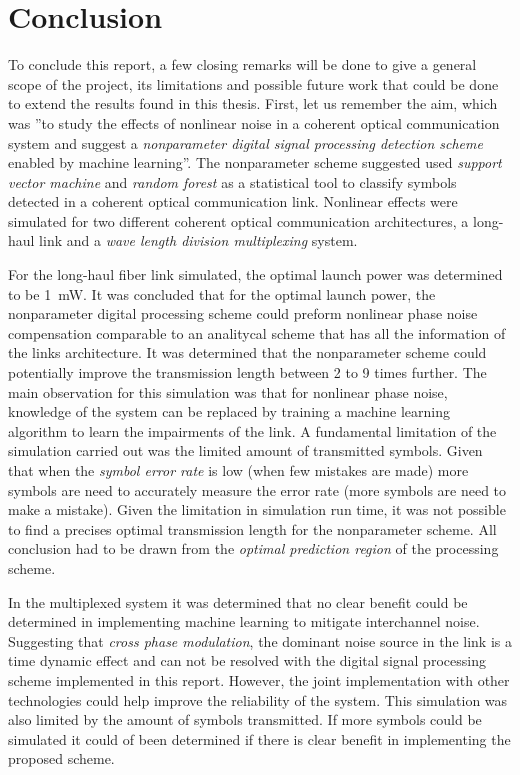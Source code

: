 \chapter{Conclusion}\label{ch:con}


To conclude this report, a few closing remarks will be done to give a general scope of the project, its limitations and possible future work that could be done to extend the results found in this thesis. First, let us remember the  aim, which was ''to study the effects of nonlinear noise in a coherent optical communication system and suggest a \textit{nonparameter digital signal processing detection scheme} enabled by machine learning''. The nonparameter scheme suggested used \textit{support vector machine} and \textit{random forest} as a statistical tool to classify symbols detected in a coherent optical communication link. Nonlinear effects were simulated for two different coherent optical communication architectures, a long-haul link and a \textit{wave length division multiplexing} system.

For the long-haul fiber link simulated, the optimal launch power was determined to be 1~mW. It was concluded that for the optimal launch power, the nonparameter digital processing scheme could preform nonlinear phase noise compensation comparable to an analitycal scheme that has all the information of the links architecture. It was determined that the nonparameter  scheme could potentially improve the transmission length between 2 to 9 times further. The main observation for this simulation was that for nonlinear phase noise, knowledge of the system can be replaced by training a machine learning algorithm to learn the impairments of the link. A fundamental limitation of the simulation carried out was the limited amount of transmitted symbols. Given that when the \textit{symbol error rate} is low (when few mistakes are made) more symbols are need to accurately measure the error rate (more symbols are need to make a mistake). Given the limitation in simulation run time, it was not possible to find a precises optimal transmission length for the nonparameter scheme. All conclusion had to be drawn from the \textit{optimal prediction region} of the processing scheme.

In the multiplexed system it was determined that no clear benefit could be determined in implementing machine learning to mitigate interchannel noise. Suggesting that \textit{cross phase modulation}, the dominant noise source in the link is a time dynamic effect and can not be resolved with the digital signal processing scheme implemented in this report. However, the joint implementation with other technologies could help improve the reliability of the system. This simulation was also limited by the amount of symbols transmitted. If more symbols could be simulated it could of been determined if there is clear benefit in implementing the proposed scheme. 

